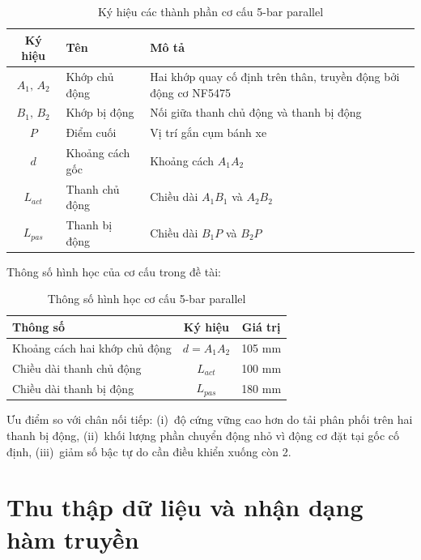 \begin{table}[H]
    \centering
    \caption{Ký hiệu các thành phần cơ cấu 5-bar parallel}
    \label{tab:5bar_notation}
    \renewcommand{\arraystretch}{1.3}
    \begin{tabular}{|c|l|p{7cm}|}
    \hline
    \textbf{Ký hiệu} & \textbf{Tên} & \textbf{Mô tả} \\
    \hline
    $A_1,\,A_2$ & Khớp chủ động & Hai khớp quay cố định trên thân,
                  truyền động bởi động cơ NF5475 \\
    \hline
    $B_1,\,B_2$ & Khớp bị động & Nối giữa thanh chủ động và thanh bị động \\
    \hline
    $P$         & Điểm cuối     & Vị trí gắn cụm bánh xe \\
    \hline
    $d$         & Khoảng cách gốc & Khoảng cách $A_1A_2$ \\
    \hline
    $L_{act}$   & Thanh chủ động & Chiều dài $A_1B_1$ và $A_2B_2$ \\
    \hline
    $L_{pas}$   & Thanh bị động  & Chiều dài $B_1P$ và $B_2P$ \\
    \hline
    \end{tabular}
\end{table}

Thông số hình học của cơ cấu trong đề tài:

\begin{table}[H]
    \centering
    \caption{Thông số hình học cơ cấu 5-bar parallel}
    \label{tab:5bar_params}
    \renewcommand{\arraystretch}{1.3}
    \begin{tabular}{|l|c|c|}
    \hline
    \textbf{Thông số} & \textbf{Ký hiệu} & \textbf{Giá trị} \\
    \hline
    Khoảng cách hai khớp chủ động & $d = A_1A_2$ & 105 mm \\
    Chiều dài thanh chủ động      & $L_{act}$    & 100 mm \\
    Chiều dài thanh bị động       & $L_{pas}$    & 180 mm \\
    \hline
    \end{tabular}
\end{table}

Ưu điểm so với chân nối tiếp: (i)~độ cứng vững cao hơn do tải phân phối
trên hai thanh bị động, (ii)~khối lượng phần chuyển động nhỏ vì động cơ
đặt tại gốc cố định, (iii)~giảm số bậc tự do cần điều khiển xuống còn 2.


\section{Thu thập dữ liệu và nhận dạng hàm truyền}
\label{sec:data_sysid}

